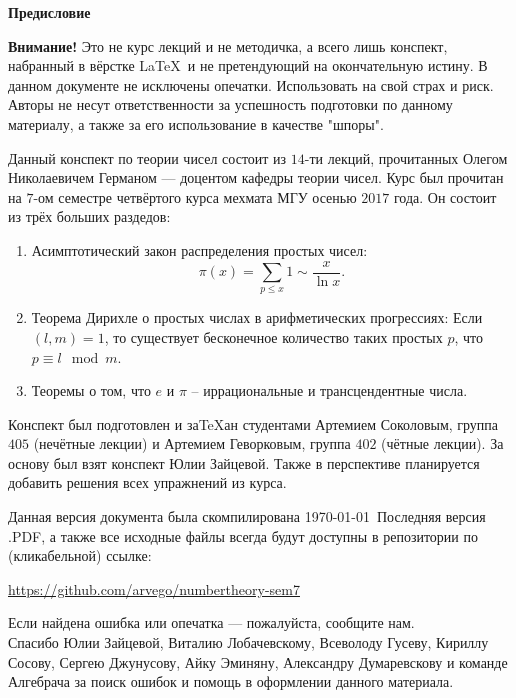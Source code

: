 \begin{center}
	\Large \bf{Предисловие}~\\
\end{center}

\tab \textbf{Внимание!} Это не курс лекций и не методичка, а всего лишь конспект, набранный в вёрстке \LaTeX~{}и не претендующий на окончательную истину. В данном документе не исключены опечатки. Использовать на свой страх и риск. Авторы не несут ответственности за успешность подготовки по данному материалу, а также за его использование в качестве "шпоры".

\tab Данный конспект по теории чисел состоит из $14$-ти лекций, прочитанных Олегом Николаевичем Германом --- доцентом кафедры теории чисел. Курс был прочитан на $7$-ом семестре четвёртого курса мехмата МГУ осенью $2017$ года. Он состоит из трёх больших раздедов:
\begin{enumerate}[nolistsep]
 	\item Асимптотический закон распределения простых чисел: 
			$$\pi(x) = \sum_{p \leq x} 1 \sim \frac{x}{\ln x}.$$
	\item Теорема Дирихле о простых числах в арифметических прогрессиях:
			Если $(l, m) = 1$, то существует бесконечное количество таких простых $p$, что $p \equiv l \mod m$.
	\item Теоремы о том, что  $e$ и $\pi$ -- иррациональные и трансцендентные числа.
\end{enumerate}

\tab Конспект был подготовлен и за\TeX ан студентами Артемием Соколовым, группа $405$ (нечётные лекции) и Артемием Геворковым, группа $402$ (чётные лекции). За основу был взят конспект Юлии Зайцевой. Также в перспективе планируется добавить решения всех упражнений из курса.

\tab Данная версия документа была скомпилирована \today~{}Последняя версия .PDF, а также все исходные файлы всегда будут доступны в репозитории по (кликабельной) ссылке:
\begin{center}
\href{https://github.com/arvego/numbertheory-sem7}{https://github.com/arvego/numbertheory-sem7}
\end{center}
Если найдена ошибка или опечатка --- пожалуйста, сообщите нам.\\



\tab Спасибо Юлии Зайцевой, Виталию Лобачевскому, Всеволоду Гусеву, Кириллу Сосову, Сергею Джунусову, Айку Эминяну, Александру Думаревскову и команде Алгебрача за поиск ошибок и помощь в оформлении данного материала.